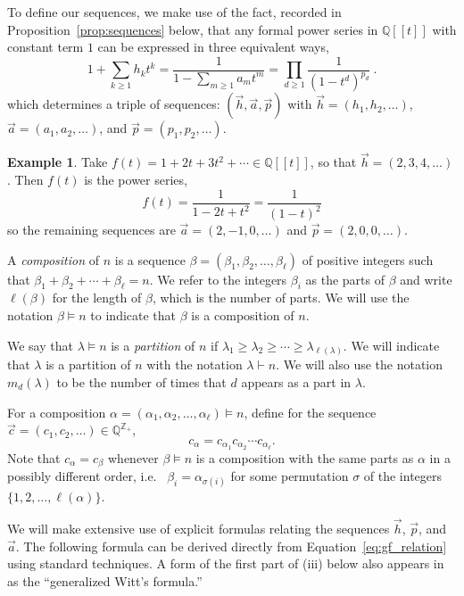 \documentclass[11pt]{amsart}
\newcommand{\defncolor}{\color{darkred}}
\newcommand{\defn}[1]{{\defncolor\emph{#1}}} %
\theoremstyle{definition}
\newtheorem{example}[theorem]{Example}
\numberwithin{equation}{section}
\def\ZZ{{\mathbb Z}}
\def\QQ{{\mathbb Q}}
\begin{document}
To define our sequences, we make use of the fact, recorded in Proposition~\ref{prop:sequences}
below, that any formal power series in $\QQ[\![t]\!]$ with constant term $1$
can be expressed in three equivalent ways,
\begin{equation}
\label{eq:gf_relation}
1 + \sum_{k \geq 1} h_k t^k = \frac{1}{1 - \sum_{m \geq 1} a_m t^m} = \prod_{d \geq 1} \frac{1}{(1-t^d)^{p_d}}~.
\end{equation}
which determines a triple of sequences: $(\vec{h}, \vec{a}, \vec{p})$ with $\vec{h} = (h_{1}, h_{2}, \ldots)$, $\vec{a} = (a_{1}, a_{2}, \ldots)$, and $\vec{p} = (p_{1}, p_{2}, \ldots)$.

\begin{example}
Take $f(t) = 1 + 2t + 3 t^{2} + \cdots \in \QQ[\![t]\!]$, so that $\vec{h} = (2, 3, 4, \ldots)$.
Then $f(t)$ is the power series,
\[
f(t) = \frac{1}{1 - 2 t + t^{2}} = \frac{1}{(1-t)^{2}}
\]
so the remaining sequences are $\vec{a} = (2, -1, 0, \ldots)$ and $\vec{p} = (2, 0, 0, \ldots)$.
\end{example}
A \defn{composition} of $n$ is a sequence $\beta = (\beta_1, \beta_2, \ldots, \beta_\ell)$ of positive integers such that $\beta_{1} + \beta_{2} + \cdots + \beta_{\ell} = n$.  
We refer to the integers $\beta_{i}$ as the parts of $\beta$ and write $\ell(\beta)$ for the length of $\beta$, which is the number of parts.  
We will use the notation $\beta \vDash n$ to indicate that $\beta$ is a composition of $n$.

We say that $\lambda \vDash n$ is a \defn{partition} of $n$ if $\lambda_1 \geq \lambda_2 \geq \cdots \geq \lambda_{\ell(\lambda)}$.  We will indicate that $\lambda$ is a partition
of $n$ with the notation $\lambda \vdash n$.  We will also use the notation $m_d(\lambda)$ to be the number of times
that $d$ appears as a part in $\lambda$.

For a composition $\alpha = (\alpha_{1}, \alpha_{2}, \ldots, \alpha_{\ell}) \vDash n$,
define for the sequence $\vec{c} = (c_{1}, c_{2}, \ldots) \in \QQ^{\ZZ_+}$,
\[
c_{\alpha} = c_{\alpha_{1}} c_{\alpha_{2}} \cdots c_{\alpha_{\ell}}.
\]
Note that $c_{\alpha} = c_{\beta}$ whenever $\beta \vDash n$ is a composition with the same parts as $\alpha$ in a possibly different order, i.e.~ $\beta_{i} = \alpha_{\sigma(i)}$ for some permutation $\sigma$ of the integers $\{1,2, \ldots, \ell(\alpha)\}$.


We will make extensive use of explicit formulas relating the sequences $\vec{h}$, $\vec{p}$, and $\vec{a}$.  The following formula can be derived directly from Equation~\eqref{eq:gf_relation} using standard techniques.  A form of the first part of (iii) below also appears in~\cite[Theorem 2.2]{KK95} as the ``generalized Witt's formula.''
\end{document}
